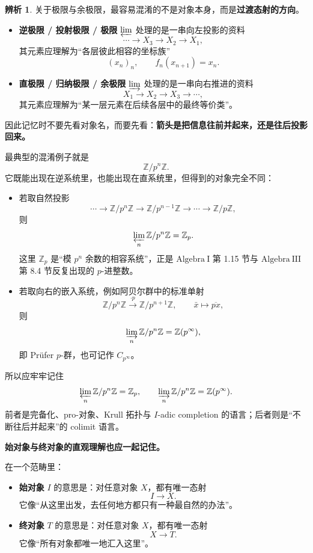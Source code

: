 \documentclass[a4paper]{ctexart}
\theoremstyle{definition}
\theoremstyle{analysis}
\newtheorem{remark}{辨析}[section]
\theoremstyle{plain}
\begin{document}
\begin{remark}
\label{rem:limits-colimits-padic}
关于极限与余极限，最容易混淆的不是对象本身，而是\textbf{过渡态射的方向}。

\begin{itemize}
  \item \textbf{逆极限 / 投射极限 / 极限} \(\varprojlim\) 处理的是一串向左投影的资料
  \[
    \cdots \to X_3\to X_2\to X_1,
  \]
  其元素应理解为“各层彼此相容的坐标族”
  \[
    (x_n)_n,\qquad f_n(x_{n+1})=x_n.
  \]
  \item \textbf{直极限 / 归纳极限 / 余极限} \(\varinjlim\) 处理的是一串向右推进的资料
  \[
    X_1\to X_2\to X_3\to \cdots,
  \]
  其元素应理解为“某一层元素在后续各层中的最终等价类”。
\end{itemize}

因此记忆时不要先看对象名，而要先看：\textbf{箭头是把信息往前并起来，还是往后投影回来。}

\medskip

最典型的混淆例子就是
\[
  \mathbb Z/p^n\mathbb Z.
\]
它既能出现在逆系统里，也能出现在直系统里，但得到的对象完全不同：
\begin{itemize}
  \item 若取自然投影
  \[
    \cdots \to \mathbb Z/p^n\mathbb Z \to \mathbb Z/p^{n-1}\mathbb Z \to \cdots \to \mathbb Z/p\mathbb Z,
  \]
  则
  \[
    \varprojlim_n \mathbb Z/p^n\mathbb Z=\mathbb Z_p.
  \]
  这里 \(\mathbb Z_p\) 是“模 \(p^n\) 余数的相容系统”，正是 \(\mathrm{Algebra\ I}\) 第 1.15 节与 \(\mathrm{Algebra\ III}\) 第 8.4 节反复出现的 \(p\)-进整数。
  \item 若取向右的嵌入系统，例如阿贝尔群中的标准单射
  \[
    \mathbb Z/p^n\mathbb Z \xrightarrow{\cdot p} \mathbb Z/p^{n+1}\mathbb Z,
    \qquad
    \bar x\mapsto \overline{px},
  \]
  则
  \[
    \varinjlim_n \mathbb Z/p^n\mathbb Z=\mathbb Z(p^\infty),
  \]
  即 Prüfer \(p\)-群，也可记作 \(C_{p^\infty}\)。
\end{itemize}

所以应牢牢记住
\[
  \varprojlim_n \mathbb Z/p^n\mathbb Z=\mathbb Z_p,
  \qquad
  \varinjlim_n \mathbb Z/p^n\mathbb Z=\mathbb Z(p^\infty).
\]
前者是完备化、pro-对象、Krull 拓扑与 \(I\)-adic completion 的语言；后者则是“不断往后并起来”的 colimit 语言。

\medskip

\label{rem:initial-terminal-limits}
\textbf{始对象与终对象的直观理解也应一起记住。}

在一个范畴里：
\begin{itemize}
  \item \textbf{始对象} \(I\) 的意思是：对任意对象 \(X\)，都有唯一态射
  \[
    I\to X.
  \]
  它像“从这里出发，去任何地方都只有一种最自然的办法”。
  \item \textbf{终对象} \(T\) 的意思是：对任意对象 \(X\)，都有唯一态射
  \[
    X\to T.
  \]
  它像“所有对象都唯一地汇入这里”。
\end{itemize}


\end{remark}
\end{document}
